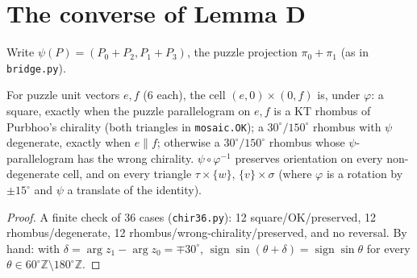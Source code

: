\documentclass[11pt]{article}
\theoremstyle{definition}\newtheorem{definition}[theorem]{Definition}\newtheorem{remark}[theorem]{Remark}
\newcommand{\Z}{\mathbb Z}\newcommand{\R}{\mathbb R}
\begin{document}
\section{The converse of Lemma D}\label{sec:S}
Write $\psi(P)=(P_0+P_2,P_1+P_3)$, the puzzle projection $\pi_0+\pi_1$ (as in \texttt{bridge.py}).

\begin{lemma}\label{lem:36}
For puzzle unit vectors $e,f$ (6 each), the cell $(e,0)\times(0,f)$ is, under $\varphi$:
a square, exactly when the puzzle parallelogram on $e,f$ is a KT rhombus of Purbhoo's chirality (both triangles in \texttt{mosaic.OK});
a $30^\circ/150^\circ$ rhombus with $\psi$ degenerate, exactly when $e\parallel f$;
otherwise a $30^\circ/150^\circ$ rhombus whose $\psi$-parallelogram has the wrong chirality.
$\psi\circ\varphi^{-1}$ preserves orientation on every non-degenerate cell, and on every triangle $\tau\times\{w\}$, $\{v\}\times\sigma$ (where $\varphi$ is a rotation by $\pm15^\circ$ and $\psi$ a translate of the identity).
\end{lemma}
\begin{proof}
A finite check of 36 cases (\texttt{chir36.py}): 12 square/OK/preserved, 12 rhombus/degenerate, 12 rhombus/wrong-chirality/preserved, and no reversal. By hand: with $\delta=\arg z_1-\arg z_0=\mp30^\circ$, $\operatorname{sign}\sin(\theta+\delta)=\operatorname{sign}\sin\theta$ for every $\theta\in60^\circ\Z\setminus180^\circ\Z$.
\end{proof}
\end{document}
